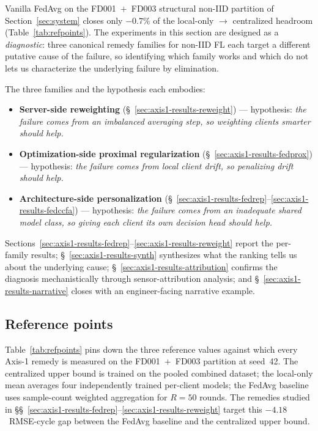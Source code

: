 \documentclass[a4paper,fleqn,doubleblind]{cas-sc}
\begin{document}
Vanilla FedAvg on the FD001~$+$~FD003 structural non-IID partition of
Section~\ref{sec:system} closes only $-0.7\%$ of the local-only
$\to$ centralized headroom (Table~\ref{tab:refpoints}). The experiments in
this section are designed as a \emph{diagnostic}: three canonical remedy
families for non-IID FL each target a different putative cause of the
failure, so identifying which family works and which do not lets us
characterize the underlying failure by elimination.

The three families and the hypothesis each embodies:
\begin{itemize}
    \item \textbf{Server-side reweighting} (\S~\ref{sec:axis1-results-reweight}) --- hypothesis: \emph{the failure comes from an imbalanced averaging step, so weighting clients smarter should help.}
    \item \textbf{Optimization-side proximal regularization} (\S~\ref{sec:axis1-results-fedprox}) --- hypothesis: \emph{the failure comes from local client drift, so penalizing drift should help.}
    \item \textbf{Architecture-side personalization} (\S~\ref{sec:axis1-results-fedrep}--\ref{sec:axis1-results-fedccfa}) --- hypothesis: \emph{the failure comes from an inadequate shared model class, so giving each client its own decision head should help.}
\end{itemize}

Sections~\ref{sec:axis1-results-fedrep}--\ref{sec:axis1-results-reweight}
report the per-family results; \S~\ref{sec:axis1-results-synth}
synthesizes what the ranking tells us about the underlying cause;
\S~\ref{sec:axis1-results-attribution} confirms the diagnosis
mechanistically through sensor-attribution analysis; and
\S~\ref{sec:axis1-results-narrative} closes with an engineer-facing
narrative example.

\subsection{Reference points}
\label{sec:axis1-results-refpoints}

Table~\ref{tab:refpoints} pins down the three reference values against
which every Axis-1 remedy is measured on the FD001~$+$~FD003 partition
at seed~42. The centralized upper bound is trained on the pooled
combined dataset; the local-only mean averages four independently
trained per-client models; the FedAvg baseline uses sample-count
weighted aggregation for $R = 50$ rounds. The remedies studied in
\S\S~\ref{sec:axis1-results-fedrep}--\ref{sec:axis1-results-reweight}
target this $-4.18$~RMSE-cycle gap between the FedAvg baseline and the
centralized upper bound.
\end{document}
